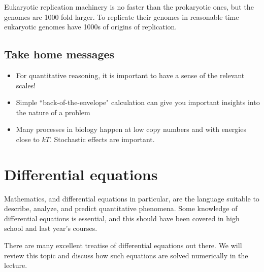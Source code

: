 Eukaryotic replication machinery is no faster than the prokaryotic ones, but the genomes are 1000 fold larger.
To replicate their genomes in reasonable time eukaryotic genomes have 1000s of origins of replication.

\subsection{Take home messages}

\begin{itemize}
    \item For quantitative reasoning, it is important to have a sense of the relevant scales!
    \item Simple ``back-of-the-envelope" calculation can give you important insights into the nature of a problem
    \item Many processes in biology happen at low copy numbers and with energies close to $kT$. Stochastic effects are important.
\end{itemize}

\section{Differential equations}
Mathematics, and differential equations in particular, are the language suitable to describe, analyze, and predict quantitative phenomena.
Some knowledge of differential equations is essential, and this should have been covered in high school and last year's courses.

There are many excellent treatise of differential equations out there.
We will review this topic and discuss how such equations are solved numerically in the lecture.




